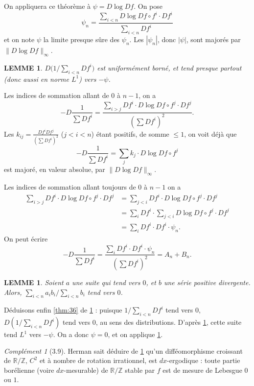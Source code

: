 \documentclass[12pt]{amsart}
\theoremstyle{plain}
\newtheorem{lemme}[theoreme]{LEMME}
\theoremstyle{remark}
\newtheorem*{compl}{Compl\'{e}ment}
\begin{document}
On appliquera ce th\'{e}or\`{e}me \`{a} $\psi = D\log Df$. On pose
\[
\psi_{n} = \frac{\sum_{i < n} D\log Df \circ f^{i} \cdot Df^{i}}{\sum_{i < n} Df^{i}}
\]
et on note $\psi$ la limite presque s\^{u}re des $\psi_{n}$. Les $|\psi_{n}|$, donc $|\psi|$, sont major\'{e}s par $\|D\log Df\|_{\infty}$.

\begin{lemme}\label{lem:37}
$D\bigl(1/\sum_{i < n} Df^{i}\bigr)$ est uniform\'{e}ment born\'{e}, et tend presque partout (donc aussi en norme $L^{1}$) vers $-\psi$.
\end{lemme}

Les indices de sommation allant de $0$ \`{a} $n-1$, on a
\[
-D\frac{1}{\sum Df^{i}} = \frac{\sum_{i > j} Df^{i} \cdot D\log Df \circ f^{j} \cdot Df^{j}}{(\sum Df^{i})^{2}} .
\]
Les $k_{ij} = \frac{Df^{i}Df^{j}}{(\sum Df^{i})^{2}}$ ($j < i < n$) \'{e}tant positifs, de somme $\leq 1$, on voit d\'{e}j\`{a} que
\[
-D\frac{1}{\sum Df^{i}} = \sum_{j} k_{j} \cdot D\log Df \circ f^{j}
\]
est major\'{e}, en valeur absolue, par $\|D\log Df\|_{\infty}$.

Les indices de sommation allant toujours de $0$ \`{a} $n-1$ on a
\begin{align*}
\sum_{i > j} Df^{i} \cdot D\log Df \circ f^{j} \cdot Df^{j} &= \sum_{j < i} Df^{i} \cdot D\log Df \circ f^{j} \cdot Df^{j} \\
&= \sum_{i} Df^{i} \cdot \sum_{j < i} D\log Df \circ f^{j} \cdot Df^{j} \\
&= \sum_{i} Df^{i} \cdot Df^{i} \cdot \psi_{n} .
\end{align*}
On peut \'{e}crire
\[
-D\frac{1}{\sum Df^{i}} = \frac{\sum_{i} Df^{i} \cdot Df^{i} \cdot \psi_{n}}{(\sum Df^{i})^{2}} = A_{n} + B_{n} .
\]

\begin{lemme}\label{lem:38}
Soient $a$ une suite qui tend vers $0$, et $b$ une s\'{e}rie positive divergente. Alors, $\sum_{i < n} a_{i}b_{i} / \sum_{i < n} b_{i}$ tend vers $0$.
\end{lemme}

D\'{e}duisons enfin \ref{thm:36} de \ref{lem:37} : puisque $1/\sum_{i < n} Df^{i}$ tend vers $0$, $D(1/\sum_{i < n} Df^{i})$ tend vers $0$, au sens des distributions. D'apr\`{e}s \ref{lem:37}, cette suite tend $L^{1}$ vers $-\psi$. On a donc $\psi = 0$, et on applique \ref{lem:37}.

\begin{compl}[3.9]
Herman sait d\'{e}duire de \ref{lem:37} qu'un diff\'{e}omorphisme croissant de $\mathbb{R}/\mathbb{Z}$, $C^{2}$ et \`{a} nombre de rotation irrationnel, est $dx$-ergodique : toute partie bor\'{e}lienne (voire $dx$-mesurable) de $\mathbb{R}/\mathbb{Z}$ stable par $f$ est de mesure de Lebesgue $0$ ou $1$.
\end{compl}
\end{document}
